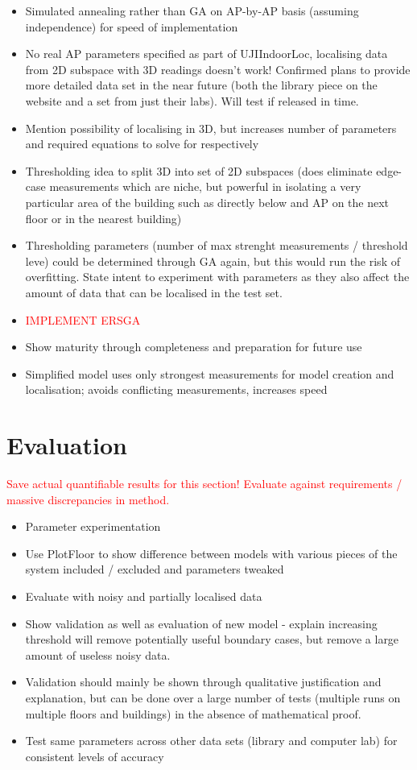 \documentclass{UoYCSproject}
\begin{document}
			\begin{itemize}
				\item Simulated annealing rather than GA on AP-by-AP basis (assuming independence) for speed of implementation
				\item No real AP parameters specified as part of UJIIndoorLoc, localising data from 2D subspace with 3D readings doesn't work! Confirmed plans to provide more detailed data set in the near future (both the library piece on the website and a set from just their labs). Will test if released in time.
				\item Mention possibility of localising in 3D, but increases number of parameters and required equations to solve for respectively
				\item Thresholding idea to split 3D into set of 2D subspaces (does eliminate edge-case measurements which are niche, but powerful in isolating a very particular area of the building such as directly below and AP on the next floor or in the nearest building)
				\item Thresholding parameters (number of max strenght measurements / threshold leve) could be determined through GA again, but this would run the risk of overfitting. State intent to experiment with parameters as they also affect the amount of data that can be localised in the test set.
				\item \textcolor{red}{IMPLEMENT ERSGA}
				\item Show maturity through completeness and preparation for future use
				\item Simplified model uses only strongest measurements for model creation and localisation; avoids conflicting measurements, increases speed
			\end{itemize}
        
	\chapter{Evaluation}
	
		\textcolor{red}{Save actual quantifiable results for this section! Evaluate against requirements / massive discrepancies in method.}
		\begin{itemize}
			\item Parameter experimentation
			\item Use PlotFloor to show difference between models with various pieces of the system included / excluded and parameters tweaked
			\item Evaluate with noisy and partially localised data
			\item Show validation as well as evaluation of new model - explain increasing threshold will remove potentially useful boundary cases, but remove a large amount of useless noisy data.
			\item Validation should mainly be shown through qualitative justification and explanation, but can be done over a large number of tests (multiple runs on multiple floors and buildings) in the absence of mathematical proof.
			\item Test same parameters across other data sets (library and computer lab) for consistent levels of accuracy
		\end{itemize}
		
\end{document}
